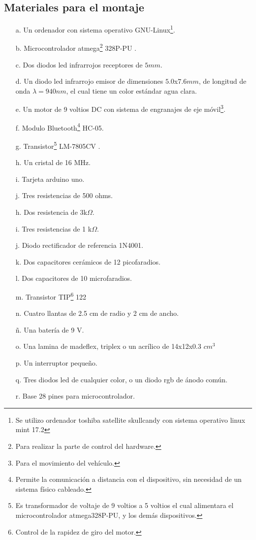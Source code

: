 \documentclass[12]{article}
\begin{document}
\begin{multicols}{2}
\subsection{ Materiales para el montaje}
\begin{enumerate}
\item[a.] Un ordenador con sistema operativo GNU-Linux\footnote{Se utilizo ordenador toshiba satellite skullcandy con sistema operativo linux mint 17.2}.
\item[b.] Microcontrolador atmega\footnote{Para realizar la parte de control del hardware.} 328P-PU \cite{ARDUINO}.
\item[c.] Dos diodos led infrarrojos receptores de $5 mm$.
\item[d.] Un diodo led infrarrojo emisor de dimensiones  $5.0$x$7.6 mm$, de longitud de onda $\lambda = 940 nm $,  el cual tiene un color estándar agua clara.
\item[e.] Un motor de 9 voltios DC con sistema de engranajes de eje móvil\footnote{Para el movimiento del vehículo.}.
\item[f.] Modulo Bluetooth\footnote{Permite la comunicación a distancia con el dispositivo, sin necesidad de un sistema físico cableado.} HC-05.
\item[g.] Transistor\footnote{Es transformador de voltaje de 9 voltios a 5 voltios el cual alimentara el microcontrolador atmega328P-PU, y los demás dispositivos.} LM-7805CV \cite{REGULADOR}.
\item[h.] Un cristal de 16 MHz.
\item[i.] Tarjeta arduino \cite{ARDUINO} uno.
\item[j.] Tres resistencias de 500 ohms.
\item[h.] Dos resistencia de 3k$\Omega$.
\item[i.] Tres resistencias de 1 k$\Omega$.
\item[j.] Diodo rectificador de referencia 1N4001. 
\item[k.] Dos capacitores cerámicos de 12 picofaradios.
\item[l.] Dos capacitores de 10 microfaradios.
\item[m.] Transistor TIP\footnote{Control de la rapidez de giro del motor.} 122\cite{TIP122}  
\item[n.] Cuatro llantas de 2.5 cm de radio y 2 cm de ancho.
\item[ñ.] Una batería de 9 V.
\item[o.] Una lamina de madeflex, triplex  o un acrílico de 14x12x0.3 $cm^{3}$
\item[p.] Un interruptor pequeño.
\item[q.] Tres diodos led de cualquier color, o un diodo rgb de ánodo común.
\item[r.] Base 28 pines para microcontrolador.
\end{enumerate}

\end{multicols}
\end{document}
